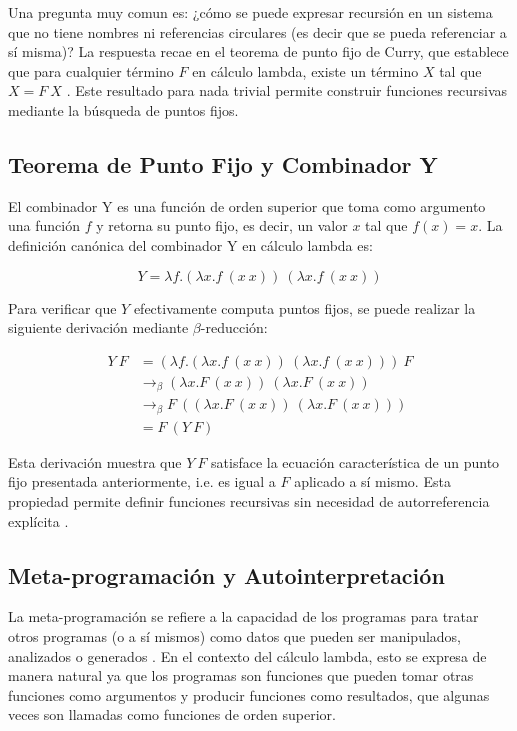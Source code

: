 \documentclass[11pt]{article}
\begin{document}
Una pregunta muy comun es: ¿cómo se puede expresar recursión en un sistema que no tiene nombres ni referencias circulares (es decir que se pueda referenciar a s\'i misma)? La respuesta recae en el teorema de punto fijo de Curry, que establece que para cualquier término $F$ en cálculo lambda, existe un término $X$ tal que $X = F\ X$ \cite{curry1958}. Este resultado para nada trivial permite construir funciones recursivas mediante la búsqueda de puntos fijos.

\subsection{Teorema de Punto Fijo y Combinador Y}

El combinador Y es una función de orden superior que toma como argumento una función $f$ y retorna su punto fijo, es decir, un valor $x$ tal que $f(x) = x$. La definición canónica del combinador Y en cálculo lambda es:

\begin{equation}
    Y = \lambda f.(\lambda x.f\ (x\ x))\ (\lambda x.f\ (x\ x))
\end{equation}

Para verificar que $Y$ efectivamente computa puntos fijos, se puede realizar la siguiente derivación mediante $\beta$-reducción:

\begin{align*}
    Y\ F &= (\lambda f.(\lambda x.f\ (x\ x))\ (\lambda x.f\ (x\ x)))\ F \\
         &\rightarrow_\beta (\lambda x.F\ (x\ x))\ (\lambda x.F\ (x\ x)) \\
         &\rightarrow_\beta F\ ((\lambda x.F\ (x\ x))\ (\lambda x.F\ (x\ x))) \\
         &= F\ (Y\ F)
\end{align*}

Esta derivación muestra que $Y\ F$ satisface la ecuación característica de un punto fijo presentada anteriormente, i.e. es igual a $F$ aplicado a sí mismo. Esta propiedad permite definir funciones recursivas sin necesidad de autorreferencia explícita \cite{barendregt1984}.

\subsection{Meta-programación y Autointerpretación}

La meta-programación se refiere a la capacidad de los programas para tratar otros programas (o a sí mismos) como datos que pueden ser manipulados, analizados o generados \cite{sheard2001}. En el contexto del cálculo lambda, esto se expresa de manera natural ya que los programas son funciones que pueden tomar otras funciones como argumentos y producir funciones como resultados, que algunas veces son llamadas como funciones de orden superior.
\end{document}
